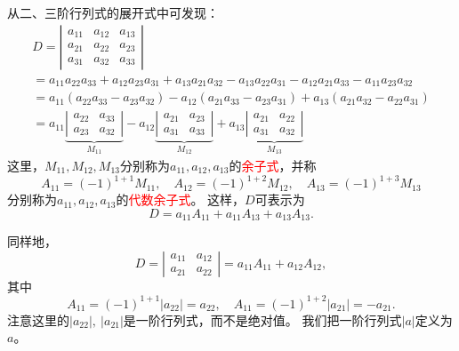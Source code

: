 \documentclass[10pt,a4paper%
tablecaptionabove]{article}
\newcommand{\red}{\textcolor{red}}
\begin{document}
\begin{CJK}{UTF8}{gkai}
  从二、三阶行列式的展开式中可发现：
  $$
  \begin{array}{l}
    D  =  \left|
    \begin{array}{ccc}
      a_{11} & a_{12} & a_{13}\\
      a_{21} & a_{22} & a_{23}\\
      a_{31} & a_{32} & a_{33}
    \end{array}
                        \right| \\[0.6cm]
    = 
    a_{11}a_{22}a_{33}+a_{12}a_{23}a_{31}+a_{13}a_{21}a_{32}
    -a_{13}a_{22}a_{31}-a_{12}a_{21}a_{33}-a_{11}a_{23}a_{32} \\[0.3cm] 
    = 
    a_{11}(a_{22}a_{33}-a_{23}a_{32})-
    a_{12}(a_{21}a_{33}-a_{23}a_{31})+
    a_{13}(a_{21}a_{32}-a_{22}a_{31}) \\[0.3cm] 
    = 
    a_{11} \underbrace{\left| \begin{array}{ccc} a_{22} & a_{33} \\ a_{23} & a_{32} \end{array} \right|}_{M_{11}} -
                                                                             a_{12} \underbrace{\left| \begin{array}{ccc} a_{21} & a_{23} \\ a_{31} & a_{33} \end{array} \right|}_{M_{12}} +
                                                                                                                                                      a_{13} \underbrace{\left| \begin{array}{ccc} a_{21} & a_{22} \\ a_{31} & a_{32} \end{array} \right|}_{M_{13}}
  \end{array}
  $$
  这里，$M_{11},M_{12},M_{13}$分别称为$a_{11},a_{12},a_{13}$的\red{余子式}，并称
  $$
  A_{11} = (-1)^{1+1} M_{11}, \quad
  A_{12} = (-1)^{1+2} M_{12}, \quad
  A_{13} = (-1)^{1+3} M_{13}
  $$
  分别称为$a_{11},a_{12},a_{13}$的\red{代数余子式}。 这样，$D$可表示为
  $$
  D= a_{11}A_{11} + a_{11}A_{13} + a_{13}A_{13}.
  $$

  同样地，
  $$
  D = \left| \begin{array}{ccc} a_{11} & a_{12} \\ a_{21} & a_{22} \end{array} \right|
  = a_{11} A_{11} + a_{12} A_{12},
  $$
  其中
  $$
  A_{11} = (-1)^{1+1}|a_{22}| =  a_{22},\quad
  A_{11} = (-1)^{1+2}|a_{21}| = -a_{21}.
  $$
  注意这里的$|a_{22}|,~|a_{21}|$是一阶行列式，而不是绝对值。
  我们把一阶行列式$|a|$定义为$a$。



\end{CJK}
\end{document}
